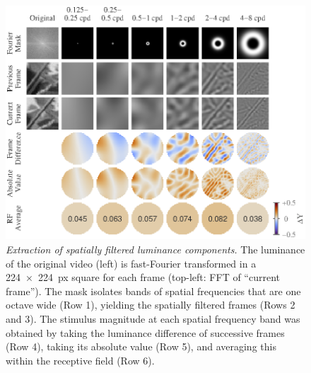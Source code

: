 \begin{figure}[htbp]
\centering \includegraphics[scale=1]{paperfigs/fig4.eps}
%
\caption{%
\textit{Extraction of spatially filtered luminance components.}
The luminance of the original video (left) is fast-Fourier transformed in a \SI{224x224}{px} square for each frame (top-left: \ac{FFT} of  ``current frame'').
The mask isolates bands of spatial frequencies that are one octave wide (Row 1), yielding the spatially filtered frames (Rows 2 and 3).
The stimulus magnitude at each spatial frequency band was obtained by taking the luminance difference of successive frames (Row 4), taking its absolute value (Row 5), and averaging this within the receptive field (Row 6).
}%
\label{fig:lam_4}
%
\end{figure}

